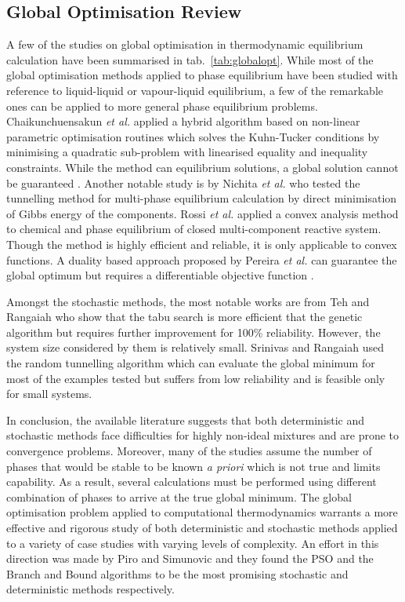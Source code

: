 	\subsection{Global Optimisation Review}
	 A few of the studies on global optimisation in thermodynamic equilibrium calculation have been summarised in tab.~\ref{tab:globalopt}. While most of the global optimisation methods applied to phase equilibrium have been studied with reference to liquid-liquid or vapour-liquid equilibrium, a few of the remarkable ones can be applied to more general phase equilibrium problems. Chaikunchuensakun \textit{et al.} \cite{Chaikunchuensakun:2002aa} applied a hybrid algorithm based on non-linear parametric optimisation routines which solves the Kuhn-Tucker conditions by minimising a quadratic sub-problem with linearised equality and inequality constraints. While the method can equilibrium solutions, a global solution cannot be guaranteed \cite{Zhang11}. Another notable study is by Nichita \textit{et al.} \cite{Nichita02} who tested the tunnelling method for multi-phase equilibrium calculation by direct minimisation of Gibbs energy of the components. Rossi \textit{et al.} \cite{ROSSI20111226} applied a convex analysis method to chemical and phase equilibrium of closed multi-component reactive system. Though the method is highly efficient and reliable, it is only applicable to convex functions. A duality based approach proposed by Pereira \textit{et al.} \cite{PEREIRA20101} can guarantee the global optimum but requires a differentiable objective function \cite{Zhang11}.
	 
	 Amongst the stochastic methods, the most notable works are from Teh and Rangaiah \cite{Teh03} who show that the tabu search is more efficient that the genetic algorithm but requires further improvement for 100\% reliability. However, the system size considered by them is relatively small. Srinivas and Rangaiah \cite{Srinivas06} used the random tunnelling algorithm which can evaluate the global minimum for most of the examples tested but suffers from low reliability and is feasible only for small systems.
	 
	 In conclusion, the available literature suggests that both deterministic and stochastic methods face difficulties for highly non-ideal mixtures and are prone to convergence problems. Moreover, many of the studies assume the number of phases that would be stable to be known \textit{a priori} which is not true and limits capability. As a result, several calculations must be performed using different combination of phases to arrive at the true global minimum. The global optimisation problem applied to computational thermodynamics warrants a more effective and rigorous study of both deterministic and stochastic methods applied to a variety of case studies with varying levels of complexity. An effort in this direction was made by Piro and Simunovic \cite{Piro16} and they found the PSO and the Branch and Bound algorithms to be the most promising stochastic and deterministic methods respectively. 

